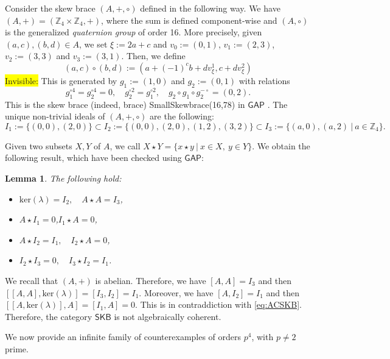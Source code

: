 \documentclass{amsart}
\newtheorem{lemma}[theorem]{Lemma}
\theoremstyle{definition}
\newenvironment{invisible}{{\noindent\sc \colorbox{yellow}{Invisible:}\;}\color{gray}}{\medskip}
\begin{document}
 Consider the skew brace $(A,+,\circ)$ defined in the following way. We have $(A,+)=(\mathbb{Z}_{4}\times\mathbb{Z}_{4},+)$, where the sum is defined component-wise and $(A,\circ)$ is the generalized \textit{quaternion group} of order 16. More precisely, given $(a,c),(b,d)\in A$, we set $\xi:=2a+c$ and $v_{0}:=(0,1)$, $v_{1}:=(2,3)$, $v_{2}:=(3,3)$ and $v_{3}:=(3,1)$. Then, we define
\[
(a,c)\circ(b,d):=(a+(-1)^{c}b+dv_{\xi}^{1},c+dv_{\xi}^{2})
\]
\begin{invisible}
This is generated by $g_{1}:=(1,0)$ and $g_{2}:=(0,1)$ with relations
\[
g_{1}^{\circ4}=g_{2}^{\circ4}=0,\quad g_{2}^{\circ2}=g_{1}^{\circ2},\quad g_{2}\circ g_{1}\circ g_{2}^{-\circ}=(0,2).
\]
\end{invisible}
This is the skew brace (indeed, brace) SmallSkewbrace(16,78) in $\mathsf{GAP}$ \cite{GAP}. The unique non-trivial ideals of $(A,+,\circ)$ are the following:
\[
I_{1}:=\{(0,0),(2,0)\}\subset I_{2}:=\{(0,0),(2,0),(1,2),(3,2)\}\subset I_{3}:=\{(a,0), (a,2)\ |\ a\in\mathbb{Z}_{4}\}.
\]

Given two subsets $X,Y$ of $A$, we call $X\star Y=\{x\star y\ |\ x\in X,\ y\in Y\}$. We obtain the following result, which have been checked using $\mathsf{GAP}$:
\begin{lemma}
The following hold:
\begin{itemize}
    \item[1)] $\mathrm{ker}(\lambda)=I_{2},\quad A\star A=I_{3}$,
    \item[2)] $A\star I_{1}=0$,\quad $I_{1}\star A=0$,
    \item[3)] $A\star I_{2}=I_{1}, \quad I_{2}\star A=0$,
    \item[4)] $I_{2}\star I_{3}=0,\quad I_{3}\star I_{2}=I_{1}$.
\end{itemize}
\end{lemma}
We recall that $(A,+)$ is abelian. Therefore, we have $[A,A]=I_{3}$ and then $[[A,A],\mathrm{ker}(\lambda)]=[I_{3},I_{2}]=I_{1}$. Moreover, we have $[A,I_{2}]=I_{1}$ and then $[[A,\mathrm{ker}(\lambda)],A]=[I_{1},A]=0$. This is in contraddiction with \eqref{eq:ACSKB}. Therefore, the category $\mathsf{SKB}$ is not algebraically coherent.\medskip

We now provide an infinite family of counterexamples of orders $p^{4}$, with $p\not=2$ prime.\medskip
\end{document}
